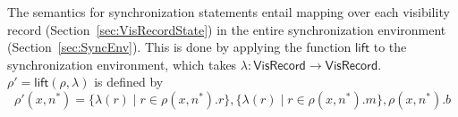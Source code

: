 

The semantics for synchronization statements entail mapping over each visibility record (Section~\ref{sec:VisRecordState}) in the entire synchronization environment (Section~\ref{sec:SyncEnv}).
This is done by applying the function $\mathsf{lift}$ to the synchronization environment, which takes $\lambda: \mathsf{VisRecord} \to \mathsf{VisRecord}$.
$\rho' = \mathsf{lift}(\rho, \lambda)$ is defined by
\begin{equation*}
    \rho'(x, n^*) = \{ \lambda(r) \mid r \in \rho(x, n^*).r \}, \{ \lambda(r) \mid r \in \rho(x, n^*).m \}, \rho(x, n^*).b
\end{equation*}


